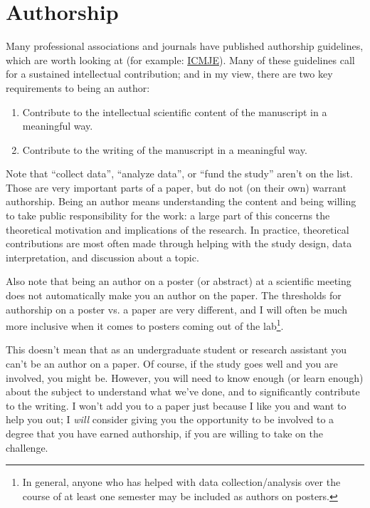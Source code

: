 \documentclass[letterpaper,12pt,oneside]{memoir}
\begin{document}
\section{Authorship}
\label{sec:authorship}

Many professional associations and journals have published authorship guidelines, which are worth looking at (for example: \href{http://www.icmje.org/recommendations/browse/roles-and-responsibilities/defining-the-role-of-authors-and-contributors.html}{ICMJE}). Many of these guidelines call for a sustained intellectual contribution; and in my view, there are two key requirements to being an author:

\begin{enumerate}
\item Contribute to the intellectual scientific content of the manuscript in a meaningful way.
\item Contribute to the writing of the manuscript in a meaningful way.
\end{enumerate}

Note that ``collect data'', ``analyze data'', or ``fund the study'' aren't on the list. Those are very important parts of a paper, but do not (on their own) warrant authorship. Being an author means understanding the content and being willing to take public responsibility for the work: a large part of this concerns the theoretical motivation and implications of the research. In practice, theoretical contributions are most often made through helping with the study design, data interpretation, and discussion about a topic.

Also note that being an author on a poster (or abstract) at a scientific meeting does not automatically make you an author on the paper. The thresholds for authorship on a poster vs. a paper are very different, and I will often be much more inclusive when it comes to posters coming out of the lab\footnote{In general, anyone who has helped with data collection/analysis over the course of at least one semester may be included as authors on posters.}.

This doesn't mean that as an undergraduate student or research assistant you can't be an author on a paper. Of course, if the study goes well and you are involved, you might be. However, you will need to know enough (or learn enough) about the subject to understand what we've done, and to significantly contribute to the writing. I won't add you to a paper just because I like you and want to help you out; I {\itshape will} consider giving you the opportunity to be involved to a degree that you have earned authorship, if you are willing to take on the challenge.
\end{document}
